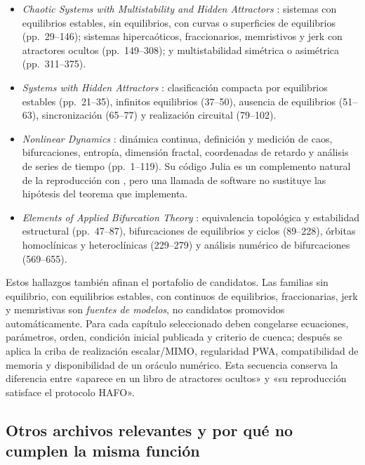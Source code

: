 \begin{itemize}
  \item \emph{Chaotic Systems with Multistability and Hidden Attractors}
        \cite{WangKuznetsovChen2021Multistability}: sistemas con equilibrios
        estables, sin equilibrios, con curvas o superficies de equilibrios
        (pp.\ 29--146); sistemas hipercaóticos, fraccionarios, memristivos y
        jerk con atractores ocultos (pp.\ 149--308); y multistabilidad
        simétrica o asimétrica (pp.\ 311--375).
  \item \emph{Systems with Hidden Attractors}
        \cite{PhamVolosKapitaniak2017Systems}: clasificación compacta por
        equilibrios estables (pp.\ 21--35), infinitos equilibrios (37--50),
        ausencia de equilibrios (51--63), sincronización (65--77) y
        realización circuital (79--102).
  \item \emph{Nonlinear Dynamics} \cite{DatserisParlitz2022Nonlinear}:
        dinámica continua, definición y medición de caos, bifurcaciones,
        entropía, dimensión fractal, coordenadas de retardo y análisis de
        series de tiempo (pp.\ 1--119). Su código Julia es un complemento
        natural de la reproducción con \juliads, pero una llamada de software
        no sustituye las hipótesis del teorema que implementa.
  \item \emph{Elements of Applied Bifurcation Theory}
        \cite{Kuznetsov2023Bifurcation}: equivalencia topológica y estabilidad
        estructural (pp.\ 47--87), bifurcaciones de equilibrios y ciclos
        (89--228), órbitas homoclínicas y heteroclínicas (229--279) y análisis
        numérico de bifurcaciones (569--655).
\end{itemize}

Estos hallazgos también afinan el portafolio de candidatos. Las familias sin
equilibrio, con equilibrios estables, con continuos de equilibrios,
fraccionarias, jerk y memristivas son \emph{fuentes de modelos}, no candidatos
promovidos automáticamente. Para cada capítulo seleccionado deben congelarse
ecuaciones, parámetros, orden, condición inicial publicada y criterio de
cuenca; después se aplica la criba de realización escalar/MIMO, regularidad
PWA, compatibilidad de memoria y disponibilidad de un oráculo numérico. Esta
secuencia conserva la diferencia entre «aparece en un libro de atractores
ocultos» y «su reproducción satisface el protocolo HAFO».

\subsection{Otros archivos relevantes y por qué no cumplen la misma función}

